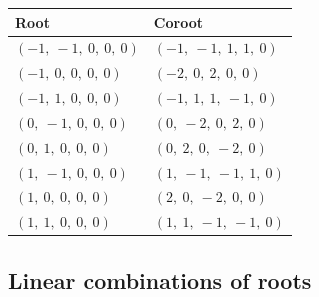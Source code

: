 \documentclass[11pt]{article}
\theoremstyle{definition}
\newif\ifsummablepairs
\begin{document}
\noindent \begin{tabular}{|l|l|}
    \hline
    \textbf{Root} & \textbf{Coroot} \\
    \hline
    $\left( -1, \  -1, \  0, \  0, \  0\right)$ & $\left( -1, \  -1, \  1, \  1, \  0\right)$ \\
    \hline
    $\left( -1, \  0, \  0, \  0, \  0\right)$ & $\left( -2, \  0, \  2, \  0, \  0\right)$ \\
    \hline
    $\left( -1, \  1, \  0, \  0, \  0\right)$ & $\left( -1, \  1, \  1, \  -1, \  0\right)$ \\
    \hline
    $\left( 0, \  -1, \  0, \  0, \  0\right)$ & $\left( 0, \  -2, \  0, \  2, \  0\right)$ \\
    \hline
    $\left( 0, \  1, \  0, \  0, \  0\right)$ & $\left( 0, \  2, \  0, \  -2, \  0\right)$ \\
    \hline
    $\left( 1, \  -1, \  0, \  0, \  0\right)$ & $\left( 1, \  -1, \  -1, \  1, \  0\right)$ \\
    \hline
    $\left( 1, \  0, \  0, \  0, \  0\right)$ & $\left( 2, \  0, \  -2, \  0, \  0\right)$ \\
    \hline
    $\left( 1, \  1, \  0, \  0, \  0\right)$ & $\left( 1, \  1, \  -1, \  -1, \  0\right)$ \\
    \hline
\end{tabular}


\ifsummablepairs
\subsection{Linear combinations of roots}
\end{document}
